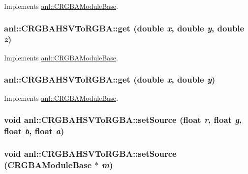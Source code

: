 Implements \hyperlink{classanl_1_1CRGBAModuleBase_ab94523074ef298bb99f0830051e78c1c}{anl::CRGBAModuleBase}.\hypertarget{classanl_1_1CRGBAHSVToRGBA_a99b2e61622cc799b7112e285903c747c}{
\subsubsection[{get}]{ anl::CRGBAHSVToRGBA::get (double {\em x}, \/  double {\em y}, \/  double {\em z})}}
\label{classanl_1_1CRGBAHSVToRGBA_a99b2e61622cc799b7112e285903c747c}


Implements \hyperlink{classanl_1_1CRGBAModuleBase_a097897c2d625c824832325260169c90e}{anl::CRGBAModuleBase}.\hypertarget{classanl_1_1CRGBAHSVToRGBA_ad1a4aecb9c5faa9927f7a8292cc46546}{
\subsubsection[{get}]{ anl::CRGBAHSVToRGBA::get (double {\em x}, \/  double {\em y})}}
\label{classanl_1_1CRGBAHSVToRGBA_ad1a4aecb9c5faa9927f7a8292cc46546}


Implements \hyperlink{classanl_1_1CRGBAModuleBase_afb6896d38ae92b9bb784fe5dc731ae67}{anl::CRGBAModuleBase}.\hypertarget{classanl_1_1CRGBAHSVToRGBA_ac4ed09cce0055ebb0d62176001aff8b2}{
\subsubsection[{setSource}]{\setlength{\rightskip}{0pt plus 5cm}void anl::CRGBAHSVToRGBA::setSource (float {\em r}, \/  float {\em g}, \/  float {\em b}, \/  float {\em a})}}
\label{classanl_1_1CRGBAHSVToRGBA_ac4ed09cce0055ebb0d62176001aff8b2}
\hypertarget{classanl_1_1CRGBAHSVToRGBA_a89bddaee553fd77a38c6c7038a5bf663}{
\subsubsection[{setSource}]{\setlength{\rightskip}{0pt plus 5cm}void anl::CRGBAHSVToRGBA::setSource ({\bf CRGBAModuleBase} $\ast$ {\em m})}}
\label{classanl_1_1CRGBAHSVToRGBA_a89bddaee553fd77a38c6c7038a5bf663}


